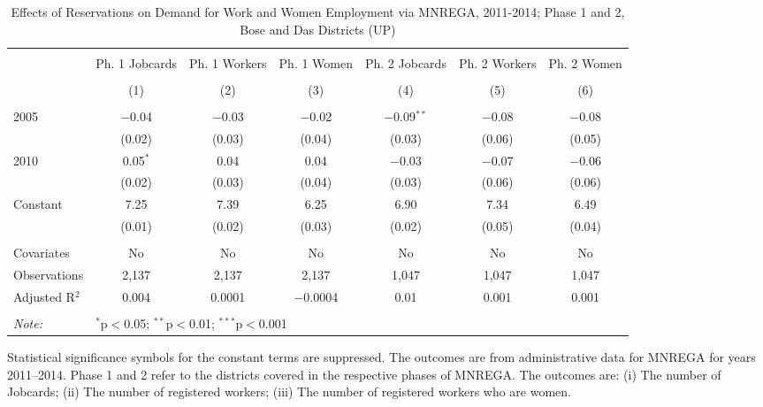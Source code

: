 \begin{sidewaystable}[!htbp]
\centering
\begin{threeparttable}

  \caption{Effects of Reservations on Demand for Work and Women Employment via MNREGA, 2011-2014;
          Phase 1 and 2, Bose and Das Districts (UP)} 
  \label{mnrega_main_up_bd} 
\scriptsize 
\begin{tabular}{@{\extracolsep{0pt}}lcccccc} 
\\[-1.8ex]\hline 
\hline \\[-1.8ex] 
 & Ph. 1 Jobcards & Ph. 1 Workers & Ph. 1 Women & Ph. 2 Jobcards & Ph. 2 Workers & Ph. 2 Women \\ 
\\[-1.8ex] & (1) & (2) & (3) & (4) & (5) & (6)\\ 
\hline \\[-1.8ex] 
 2005 & $-$0.04 & $-$0.03 & $-$0.02 & $-$0.09$^{**}$ & $-$0.08 & $-$0.08 \\ 
  & (0.02) & (0.03) & (0.04) & (0.03) & (0.06) & (0.05) \\ 
  2010 & 0.05$^{*}$ & 0.04 & 0.04 & $-$0.03 & $-$0.07 & $-$0.06 \\ 
  & (0.02) & (0.03) & (0.04) & (0.03) & (0.06) & (0.06) \\ 
  Constant & 7.25 & 7.39 & 6.25 & 6.90 & 7.34 & 6.49 \\ 
  & (0.01) & (0.02) & (0.03) & (0.02) & (0.05) & (0.04) \\ 
 \hline \\[-1.8ex] 
Covariates & No & No & No & No & No & No \\ 
Observations & 2,137 & 2,137 & 2,137 & 1,047 & 1,047 & 1,047 \\ 
Adjusted R$^{2}$ & 0.004 & 0.0001 & $-$0.0004 & 0.01 & 0.001 & 0.001 \\ 
\hline 
\hline \\[-1.8ex] 
\textit{Note:}  & \multicolumn{6}{l}{$^{*}$p$<$0.05; $^{**}$p$<$0.01; $^{***}$p$<$0.001} \\ 
\end{tabular} 
\begin{tablenotes}[flushleft]
\setlength{\itemindent}{0em}
\scriptsize
\item Statistical significance symbols for the constant terms are suppressed. The outcomes are from administrative data for MNREGA for years 2011--2014. 
                     Phase 1 and 2 refer to the districts covered in the respective phases of MNREGA. The outcomes are: 
                     (i) The number of Jobcards; 
                     (ii) The number of registered workers;
                     (iii) The number of registered workers who are women.
\end{tablenotes}
\end{threeparttable}
\end{sidewaystable}
